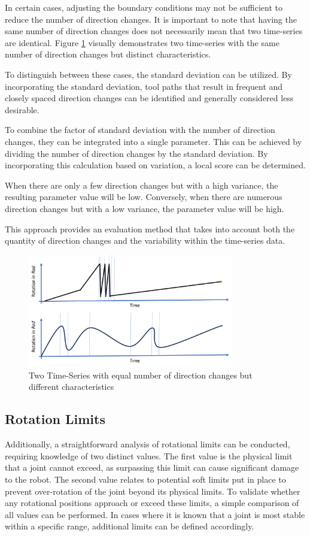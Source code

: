 \newpage
In certain cases, adjusting the boundary conditions may not be sufficient to reduce the number of direction changes. It is important to note that having the same number of direction changes does not necessarily mean that two time-series are identical. Figure \ref{dirchangeSTD} visually demonstrates two time-series with the same number of direction changes but distinct characteristics.

To distinguish between these cases, the standard deviation can be utilized. By incorporating the standard deviation, tool paths that result in frequent and closely spaced direction changes can be identified and generally considered less desirable.

To combine the factor of standard deviation with the number of direction changes, they can be integrated into a single parameter. This can be achieved by dividing the number of direction changes by the standard deviation. By incorporating this calculation based on variation, a local score can be determined.

When there are only a few direction changes but with a high variance, the resulting parameter value will be low. Conversely, when there are numerous direction changes but with a low variance, the parameter value will be high.

This approach provides an evaluation method that takes into account both the quantity of direction changes and the variability within the time-series data.

\begin{figure}[H]
	\centerline{\includegraphics[width=0.8\textwidth]{figures/DirSTD.png}}
	\caption{Two Time-Series with equal number of direction changes but different characteristics}
	\label{dirchangeSTD}
\end{figure}

\subsection{Rotation Limits}\label{RotLim}
Additionally, a straightforward analysis of rotational limits can be conducted, requiring knowledge of two distinct values. The first value is the physical limit that a joint cannot exceed, as surpassing this limit can cause significant damage to the robot. The second value relates to potential soft limits put in place to prevent over-rotation of the joint beyond its physical limits. To validate whether any rotational positions approach or exceed these limits, a simple comparison of all values can be performed. In cases where it is known that a joint is most stable within a specific range, additional limits can be defined accordingly.

